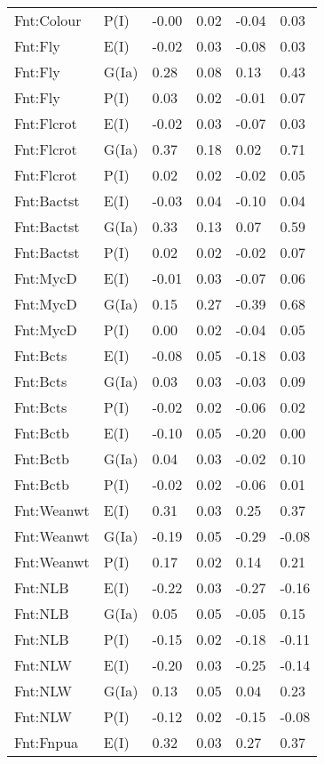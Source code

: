 \begin{center}
\begin{longtable}{|p{1.1in}|p{0.7in}|p{0.7in}|p{0.6in}|p{0.6in}|p{0.6in}|}
  Fnt:Colour & P(I) & -0.00 & 0.02 & -0.04 & 0.03 \\ 
  Fnt:Fly & E(I) & -0.02 & 0.03 & -0.08 & 0.03 \\ 
  Fnt:Fly & G(Ia) & 0.28 & 0.08 & 0.13 & 0.43 \\ 
  Fnt:Fly & P(I) & 0.03 & 0.02 & -0.01 & 0.07 \\ 
  Fnt:Flcrot & E(I) & -0.02 & 0.03 & -0.07 & 0.03 \\ 
  Fnt:Flcrot & G(Ia) & 0.37 & 0.18 & 0.02 & 0.71 \\ 
  Fnt:Flcrot & P(I) & 0.02 & 0.02 & -0.02 & 0.05 \\ 
  Fnt:Bactst & E(I) & -0.03 & 0.04 & -0.10 & 0.04 \\ 
  Fnt:Bactst & G(Ia) & 0.33 & 0.13 & 0.07 & 0.59 \\ 
  Fnt:Bactst & P(I) & 0.02 & 0.02 & -0.02 & 0.07 \\ 
  Fnt:MycD & E(I) & -0.01 & 0.03 & -0.07 & 0.06 \\ 
  Fnt:MycD & G(Ia) & 0.15 & 0.27 & -0.39 & 0.68 \\ 
  Fnt:MycD & P(I) & 0.00 & 0.02 & -0.04 & 0.05 \\ 
  Fnt:Bcts & E(I) & -0.08 & 0.05 & -0.18 & 0.03 \\ 
  Fnt:Bcts & G(Ia) & 0.03 & 0.03 & -0.03 & 0.09 \\ 
  Fnt:Bcts & P(I) & -0.02 & 0.02 & -0.06 & 0.02 \\ 
  Fnt:Bctb & E(I) & -0.10 & 0.05 & -0.20 & 0.00 \\ 
  Fnt:Bctb & G(Ia) & 0.04 & 0.03 & -0.02 & 0.10 \\ 
  Fnt:Bctb & P(I) & -0.02 & 0.02 & -0.06 & 0.01 \\ 
  Fnt:Weanwt & E(I) & 0.31 & 0.03 & 0.25 & 0.37 \\ 
  Fnt:Weanwt & G(Ia) & -0.19 & 0.05 & -0.29 & -0.08 \\ 
  Fnt:Weanwt & P(I) & 0.17 & 0.02 & 0.14 & 0.21 \\ 
  Fnt:NLB & E(I) & -0.22 & 0.03 & -0.27 & -0.16 \\ 
  Fnt:NLB & G(Ia) & 0.05 & 0.05 & -0.05 & 0.15 \\ 
  Fnt:NLB & P(I) & -0.15 & 0.02 & -0.18 & -0.11 \\ 
  Fnt:NLW & E(I) & -0.20 & 0.03 & -0.25 & -0.14 \\ 
  Fnt:NLW & G(Ia) & 0.13 & 0.05 & 0.04 & 0.23 \\ 
  Fnt:NLW & P(I) & -0.12 & 0.02 & -0.15 & -0.08 \\ 
  Fnt:Fnpua & E(I) & 0.32 & 0.03 & 0.27 & 0.37 \\ 

\end{longtable}
\end{center}
